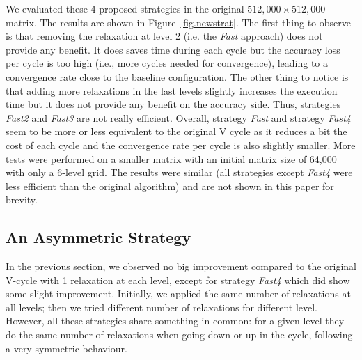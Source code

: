 
We evaluated these 4 proposed strategies in the original $512,000\times
512,000$ matrix.  The results are shown in Figure~\ref{fig.newstrat}.  The
first thing to observe is that removing the relaxation at level 2 (i.e. the \emph{Fast} approach) does not
provide any benefit. It does saves time during each cycle but the accuracy loss
per cycle is too high (i.e., more
cycles needed for convergence), leading to a convergence rate close to the baseline configuration. 
The other thing to notice is that adding more
relaxations in the last levels slightly increases the execution time but it
does not provide any benefit on the accuracy side. Thus, strategies
\emph{Fast2} and \emph{Fast3} are not really efficient.  Overall, strategy \emph{Fast} and strategy
\emph{Fast4} seem to be more or less equivalent to the original V cycle as it
reduces a bit the cost of each cycle and the convergence rate per cycle is also
slightly smaller.  More tests were performed on a smaller matrix with an
initial matrix size of 64,000 with only a 6-level grid. The results were
similar (all strategies except \emph{Fast4} were less efficient than the original algorithm) and are not shown in this paper for brevity.




\subsection{An Asymmetric Strategy}
\label{sec.assymetric}

In the previous section, we observed no big improvement compared to the
original V-cycle with 1 relaxation at each level, except for strategy
\emph{Fast4} which did show some slight improvement. Initially, we applied the
same number of relaxations at all levels; then we tried different number of
relaxations for different level. However, all these strategies share something
in common: for a given level they do the same number of relaxations when going
down or up in the cycle, following a very symmetric behaviour.

